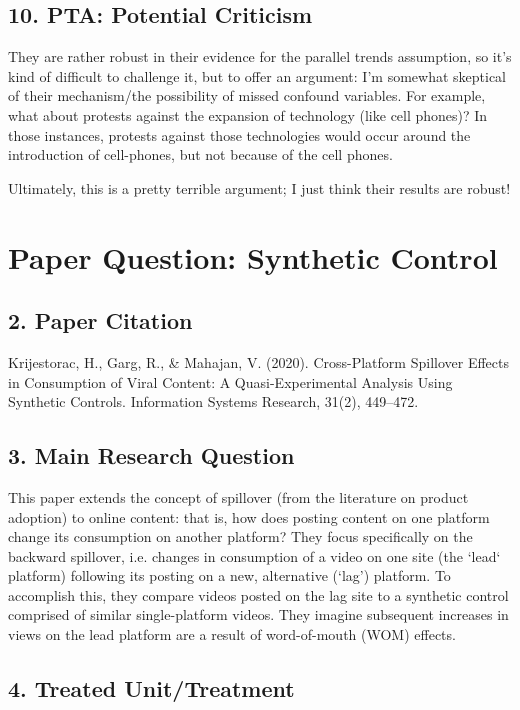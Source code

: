 \documentclass{article}
\begin{document}
\subsection*{10. PTA: Potential Criticism}

They are rather robust in their evidence for the parallel trends assumption, so it's kind of difficult to challenge it, but to offer an argument: I'm somewhat skeptical of their mechanism/the possibility of missed confound variables. For example, what about protests against the expansion of technology (like cell phones)? In those instances, protests against those technologies would occur around the introduction of cell-phones, but not because of the cell phones.

Ultimately, this is a pretty terrible argument; I just think their results are robust!

\section{Paper Question: Synthetic Control}

\subsection*{2. Paper Citation}

Krijestorac, H., Garg, R., \& Mahajan, V. (2020). Cross-Platform Spillover Effects in Consumption of Viral Content: A Quasi-Experimental Analysis Using Synthetic Controls. Information Systems Research, 31(2), 449–472.

\subsection*{3. Main Research Question}

This paper extends the concept of spillover (from the literature on product adoption) to online content: that is, how does posting content on one platform change its consumption on another platform? They focus specifically on the backward spillover, i.e. changes in consumption of a video on one site (the `lead` platform) following its posting on a new, alternative (`lag') platform. To accomplish this, they compare videos posted on the lag site to a synthetic control comprised of similar single-platform videos. They imagine subsequent increases in views on the lead platform are a result of word-of-mouth (WOM) effects.

\subsection*{4. Treated Unit/Treatment}
\end{document}
